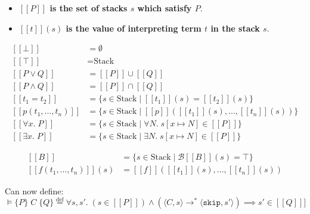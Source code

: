\documentclass[a4paper, 11pt]{article}
\newcommand{\triple}[3]{\{#1\}\;#2\;\{#3\}}
\newcommand{\interp}[2][]{\mathcal{#1}[\![#2]\!]}
\begin{document}
{{        \begin{itemize}
        \item \textbf{\(\interp{P}\) is the set of stacks \(s\) which satisfy \(P\)}.
        \item \textbf{\(\interp{t}(s)\) is the value of interpreting term \(t\) in the stack \(s\)}.
        \end{itemize} 
        \vspace{-5mm}
        \begin{minipage}[t]{0.51\textwidth}
        \begin{align*}
        \interp{\bot} &= \emptyset \\
        \interp{\top} &= \text{Stack} \\
        \interp{P \vee Q} &= \interp{P} \cup \interp{Q} \\
        \interp{P \wedge Q} &= \interp{P} \cap \interp{Q} \\
        \interp{t_1 = t_2} &= \{s\in\text{Stack} \mid \interp{t_1}(s) = \interp{t_2}(s)\} \\
        \interp{p(t_1, ..., t_n)} &= \{ s\in\text{Stack} \mid \interp{p}(\interp{t_1}(s), ..., \interp{t_n}(s)) \} \\
        \interp{\forall x.\;P} &= \{s\in\text{Stack} \mid \forall N.\; s[x \mapsto N] \in \interp{P}\} \\
        \interp{\exists x.\;P} &= \{s\in\text{Stack} \mid \exists N.\; s[x \mapsto N] \in \interp{P}\}
        \end{align*}
        \end{minipage}
        \begin{minipage}[t]{0.47\textwidth}
        \begin{align*}
        \interp{B} & = \{s\in\text{Stack} \mid \interp[B]{B}(s) = \top \} \\
        \interp{f(t_1, ..., t_n)}(s) &= \interp{f}(\interp{t_1}(s), ..., \interp{t_n}(s))
        \end{align*}
        \end{minipage}

        Can now define:
        \[\vDash \triple{P}{C}{Q} \stackrel{\text{def}}{=} \forall s,s'.\; (s\in\interp{P}) \wedge (\langle C,s \rangle \rightarrow^* \langle \texttt{skip},s' \rangle) \implies s' \in \interp{Q]}\]
    }
}
\end{document}
